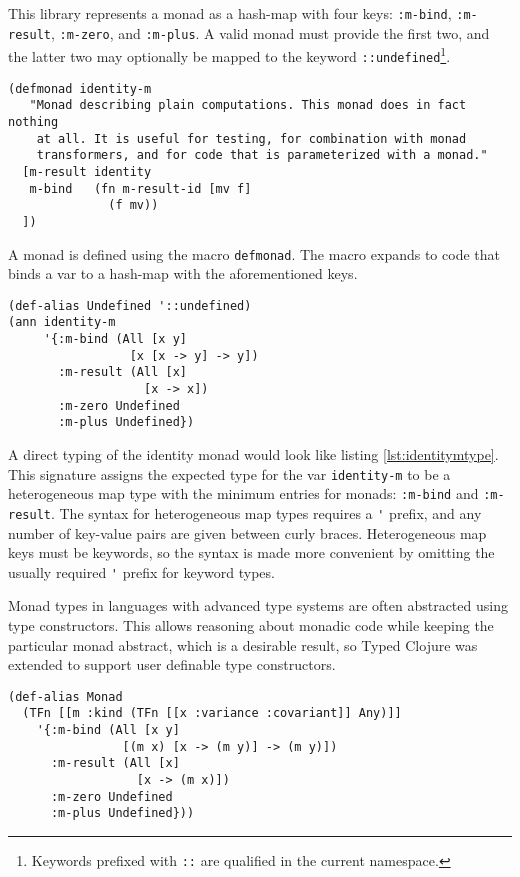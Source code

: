 This library represents a monad as a hash-map with four keys: \lstinline|:m-bind|, \lstinline|:m-result|,
\lstinline|:m-zero|, and \lstinline|:m-plus|. A valid monad must provide the first two, and the latter
two may optionally be mapped to the keyword \lstinline|::undefined|\footnote{Keywords prefixed with \lstinline|::|
are qualified in the current namespace.}.

\begin{lstlisting}[caption=Untyped definition for the identity monad, label=lst:identitymdef]
(defmonad identity-m
   "Monad describing plain computations. This monad does in fact nothing
    at all. It is useful for testing, for combination with monad
    transformers, and for code that is parameterized with a monad."
  [m-result identity
   m-bind   (fn m-result-id [mv f]
              (f mv))
  ])
\end{lstlisting}

A monad is defined using the macro \lstinline|defmonad|. The macro expands to code that binds a var to a hash-map
with the aforementioned keys.

\begin{lstlisting}[caption=Type for identity monad, label=lst:identitymtype]
(def-alias Undefined '::undefined)
(ann identity-m
     '{:m-bind (All [x y]
                 [x [x -> y] -> y])
       :m-result (All [x]
                   [x -> x])
       :m-zero Undefined
       :m-plus Undefined})
\end{lstlisting}

A direct typing of the identity monad would look like listing \ref{lst:identitymtype}.
This signature assigns the expected type for the var \lstinline|identity-m| 
to be a heterogeneous map type with the minimum entries for monads: \lstinline|:m-bind|
and \lstinline|:m-result|. The syntax for heterogeneous map types requires a \lstinline|'| prefix,
and any number of key-value pairs are given between curly braces. Heterogeneous map keys must be keywords,
so the syntax is made more convenient by omitting the usually required \lstinline|'| prefix
for keyword types.

Monad types in languages with advanced type systems are often abstracted using type constructors.
This allows reasoning about monadic code while keeping the particular monad abstract, which is a desirable result,
so Typed Clojure was extended to support user definable type constructors.

\begin{lstlisting}[caption=An abstract definition of a monad., label=lst:monadalias]
(def-alias Monad 
  (TFn [[m :kind (TFn [[x :variance :covariant]] Any)]]
    '{:m-bind (All [x y]
                [(m x) [x -> (m y)] -> (m y)])
      :m-result (All [x]
                  [x -> (m x)])
      :m-zero Undefined
      :m-plus Undefined}))
\end{lstlisting}


